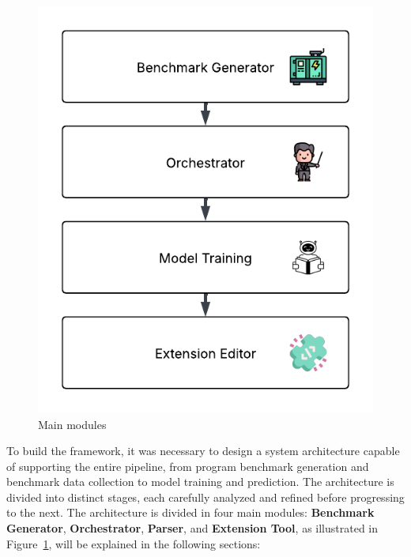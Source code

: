 \begin{figure}[htbp]
  \centering
  \includegraphics[scale=0.7]{figures/main_modules.pdf}
  \caption{Main modules}
  \label{fig:main_modules}
\end{figure}




To build the framework, it was necessary to design a system architecture capable of supporting the entire pipeline, from program benchmark generation and benchmark data collection to model training and prediction. The architecture is divided into distinct stages, each carefully analyzed and refined before progressing to the next.
The architecture is divided in four main modules: \textbf{Benchmark Generator}, \textbf{Orchestrator}, \textbf{Parser}, and \textbf{Extension Tool}, as illustrated in Figure~\ref{fig:main_modules}, will be explained in the following sections:










